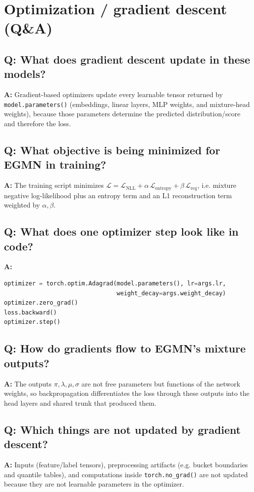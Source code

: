 \section{Optimization / gradient descent (Q\&A)}

\subsection{Q: What does gradient descent update in these models?}
\noindent\textbf{A:} Gradient-based optimizers update every learnable tensor returned by \lstinline|model.parameters()| (embeddings, linear layers, MLP weights, and mixture-head weights), because those parameters determine the predicted distribution/score and therefore the loss.

\subsection{Q: What objective is being minimized for EGMN in training?}
\noindent\textbf{A:} The training script minimizes \(\mathcal{L}=\mathcal{L}_{\mathrm{NLL}}+\alpha\,\mathcal{L}_{\mathrm{entropy}}+\beta\,\mathcal{L}_{\mathrm{reg}}\), i.e. mixture negative log-likelihood plus an entropy term and an L1 reconstruction term weighted by \(\alpha,\beta\).

\subsection{Q: What does one optimizer step look like in code?}
\noindent\textbf{A:}
\begin{lstlisting}[language=Python]
optimizer = torch.optim.Adagrad(model.parameters(), lr=args.lr,
                                weight_decay=args.weight_decay)
optimizer.zero_grad()
loss.backward()
optimizer.step()
\end{lstlisting}

\subsection{Q: How do gradients flow to EGMN's mixture outputs?}
\noindent\textbf{A:} The outputs \(\pi,\lambda,\mu,\sigma\) are not free parameters but functions of the network weights, so backpropagation differentiates the loss through these outputs into the head layers and shared trunk that produced them.

\subsection{Q: Which things are not updated by gradient descent?}
\noindent\textbf{A:} Inputs (feature/label tensors), preprocessing artifacts (e.g. bucket boundaries and quantile tables), and computations inside \lstinline|torch.no_grad()| are not updated because they are not learnable parameters in the optimizer.
